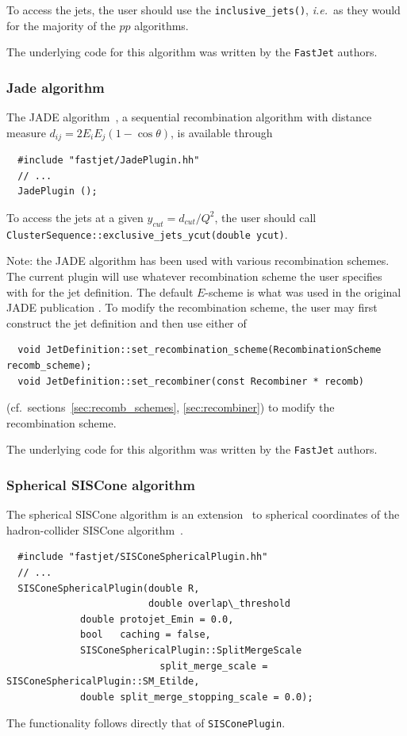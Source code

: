\documentclass[12pt,a4]{article}
\newcommand{\fastjet}{\texttt{FastJet}\xspace}
\newcommand{\ttt}[1]{{\small\texttt{#1}}}
\newcommand{\ie}{{\it i.e.}\ }
\begin{document}
To access the jets, the user should use the \verb|inclusive_jets()|,
\ie as they would for the majority of the $pp$ algorithms.

The underlying code for this algorithm was written by the \fastjet
authors.

\subsubsection{Jade algorithm}
\label{sec:ee-jade}
The JADE algorithm~\cite{Bartel:1986ua,Bethke:1988zc}, a sequential
recombination algorithm with distance measure $d_{ij} = 2E_i E_j
(1-\cos\theta)$, is available through
\begin{lstlisting}
  #include "fastjet/JadePlugin.hh"
  // ...
  JadePlugin ();
\end{lstlisting}
To access the jets at a given $y_{cut} = d_{cut}/Q^2$, the user 
should call \ttt{ClusterSequence::exclusive\_jets\_ycut(double ycut)}.

Note: the JADE algorithm has been used with various recombination
schemes. The current plugin will use whatever recombination scheme the
user specifies with for the jet definition. The default $E$-scheme is
what was used in the original JADE publication \cite{Bartel:1986ua}.
%
To modify the recombination scheme, the user may first construct the
jet definition and then use either of 
\begin{lstlisting}
  void JetDefinition::set_recombination_scheme(RecombinationScheme recomb_scheme);
  void JetDefinition::set_recombiner(const Recombiner * recomb)
\end{lstlisting}
(cf.~sections~\ref{sec:recomb_schemes}, \ref{sec:recombiner}) to modify the
recombination scheme.

The underlying code for this algorithm was written by the \fastjet
authors.

\subsubsection{Spherical SISCone algorithm}
\label{sec:spherical-siscone}

The spherical SISCone algorithm is an extension~\cite{SpheriSISCone}
to spherical coordinates of the hadron-collider SISCone
algorithm~\cite{SISCone}.
\begin{lstlisting}
  #include "fastjet/SISConeSphericalPlugin.hh"
  // ...
  SISConeSphericalPlugin(double R, 
                         double overlap\_threshold
			 double protojet_Emin = 0.0, 
			 bool   caching = false,
			 SISConeSphericalPlugin::SplitMergeScale  
                           split_merge_scale = SISConeSphericalPlugin::SM_Etilde,
			 double split_merge_stopping_scale = 0.0);
\end{lstlisting}
The functionality follows directly that of \ttt{SISConePlugin}.
\end{document}
